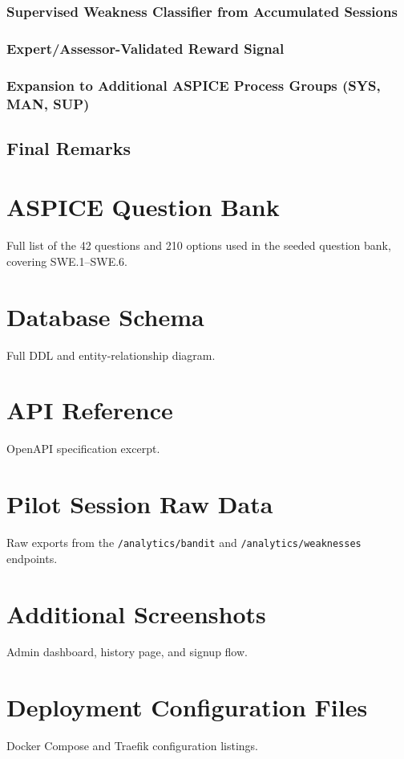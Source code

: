 \documentclass[a4paper, 12pt, oneside, openany, BCOR1cm,toc=chapterentrywithdots]{scrbook}
\begin{document}
\subsection{Supervised Weakness Classifier from Accumulated Sessions}
\subsection{Expert/Assessor-Validated Reward Signal}
\subsection{Expansion to Additional ASPICE Process Groups (SYS, MAN, SUP)}
\section{Final Remarks}






\appendix
\chapter{ASPICE Question Bank}
\label{app:questionbank}
Full list of the 42 questions and 210 options used in the seeded question bank, covering SWE.1--SWE.6.

\chapter{Database Schema}
\label{app:dbschema}
Full DDL and entity-relationship diagram.

\chapter{API Reference}
\label{app:apiref}
OpenAPI specification excerpt.

\chapter{Pilot Session Raw Data}
\label{app:pilotdata}
Raw exports from the \texttt{/analytics/bandit} and \texttt{/analytics/weaknesses} endpoints.

\chapter{Additional Screenshots}
\label{app:screenshots}
Admin dashboard, history page, and signup flow.

\chapter{Deployment Configuration Files}
\label{app:deployment}
Docker Compose and Traefik configuration listings.

\printindex
\end{document}
